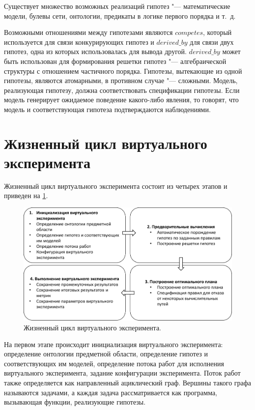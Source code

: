 Существует множество возможных реализаций гипотез "--- математические модели, булевы сети, онтологии, предикаты в 
логике первого порядка и т.~д.

Возможными отношениями между гипотезами являются $competes$, который используется для связи конкурирующих гипотез 
и $derived\_by$ для связи двух гипотез, одна из которых использовалась для вывода другой. $derived\_by$ может быть 
использован для формирования решетки гипотез "--- алгебраической структуры с отношением частичного порядка. 
Гипотезы, вытекающие из одной гипотезы, являются атомарными, в противном случае "--- сложными. 
Модель, реализующая гипотезу, должна соответствовать спецификации гипотезы. Если модель генерирует ожидаемое поведение 
какого-либо явления, то говорят, что модель и соответствующая гипотеза подтверждаются наблюдениями.


\section{Жизненный цикл виртуального эксперимента} \label{sect2_2}
Жизненный цикл виртуального эксперимента состоит из четырех этапов и приведен на \cref{fig:lifecycle_ve}. 


\begin{figure}[ht]
    \centering
    \includegraphics[width=0.9\linewidth]{images/ve_cycle.pdf}
    \caption{Жизненный цикл виртуального эксперимента.}\label{fig:lifecycle_ve}
\end{figure}

На первом этапе происходит инициализация виртуального эксперимента: определение онтологии предметной области, 
определение гипотез и соответствующих им моделей, определение потока работ для исполнения виртуального эксперимента, 
задание конфигурации эксперимента. Поток работ также определяется как направленный ациклический граф. Вершины такого 
графа называются задачами, а каждая задача рассматривается как программа, вызывающая функции, реализующие гипотезы.

